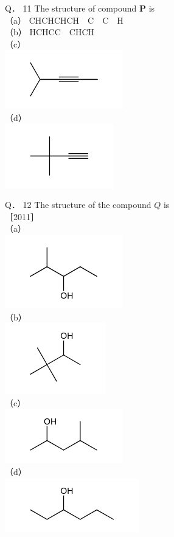\documentclass[10pt]{article}
\begin{document}
Q． 11 The structure of compound $\mathbf{P}$ is\\
（a） $\mathrm{CH} \mathrm{CHCHCH} \quad \mathrm{C} \quad \mathrm{C} \quad \mathrm{H}$\\
（b） $\mathrm{HCHC} \mathrm{C} \quad \mathrm{CHCH}$\\
（c）\\
\includegraphics{smile-4878e5724503d50b4fa799e89809982ffa717dfe}\\
（d）\\
\includegraphics{smile-6510d5eb6a8b02d37bc97eb329105d1aec9c989b}

Q． 12 The structure of the compound $Q$ is\\
［2011］\\
（a）\\
\includegraphics{smile-ac2f2c57dc4dadae80f4925c9749b5e139defe34}\\
（b）\\
\includegraphics{smile-abf651bf23c61d8710e74a19f45dc330a6540509}\\
（c）\\
\includegraphics{smile-342cb88461d91b261ce50b733e21ed0ff8039975}\\
（d）\\
\includegraphics{smile-6e2ad948fa88f58c9ee85334356e03df73e68e2b}
\end{document}
